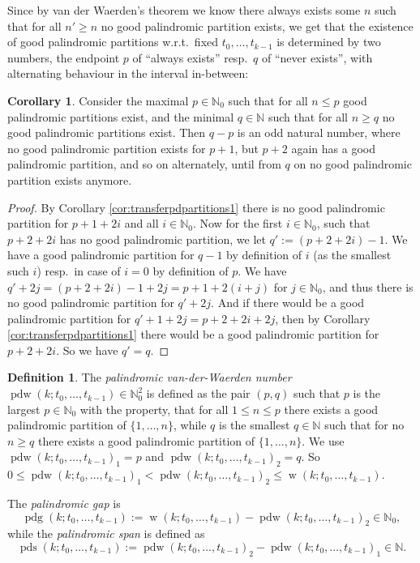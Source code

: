 \documentclass[final,3p,times]{elsarticle}
\theoremstyle{definition}
\newtheorem{defn}{Definition}[section]
\newtheorem{cor}{Corollary}[lem]
\newcommand{\set}[1]{\{#1\}}
\renewcommand{\leq}{\le} %
\newcommand{\NN}{\mathbb{N}}
\newcommand{\NNZ}{\NN_0}
\DeclareMathOperator{\vdw}{w}
\DeclareMathOperator{\vdwpd}{pdw}
\DeclareMathOperator{\pdg}{pdg}
\DeclareMathOperator{\pds}{pds}
\begin{document}
Since by van der Waerden's theorem we know there always exists some $n$ such that for all $n' \geq n$ no good palindromic partition exists, we get that the existence of good palindromic partitions w.r.t.\ fixed $t_0, \dots, t_{k-1}$ is determined by two numbers, the endpoint $p$ of ``always exists'' resp.\ $q$ of ``never exists'', with alternating behaviour in the interval in-between:
\begin{cor}\label{cor:transferpdpartitions2}
  Consider the maximal $p \in \NNZ$ such that for all $n \leq p$ good palindromic partitions exist, and the minimal $q \in \NN$ such that for all $n \geq q$ no good palindromic partitions exist. Then $q - p$ is an odd natural number, where no good palindromic partition exists for $p+1$, but $p+2$ again has a good palindromic partition, and so on alternately, until from $q$ on no good palindromic partition exists anymore.
\end{cor}
\begin{proof}
By Corollary \ref{cor:transferpdpartitions1} there is no good palindromic partition for $p+1 + 2 i$ and all $i \in \NNZ$. Now for the first $i \in \NNZ$, such that $p+2 + 2 i$ has no good palindromic partition, we let $q' := (p+2 + 2 i) - 1 $. We have a good palindromic partition for $q-1$ by definition of $i$ (as the smallest such $i$) resp.\ in case of $i=0$ by definition of $p$. We have $q' + 2 j = (p+2 + 2 i) - 1 + 2 j = p+1 + 2 (i+j)$ for $j \in \NNZ$, and thus there is no good palindromic partition for $q' + 2j$. And if there would be a good palindromic partition for $q' + 1 + 2j = p+2 + 2 i + 2 j$, then by Corollary \ref{cor:transferpdpartitions1} there would be a good palindromic partition for $p+2 + 2i$. So we have $q' = q$.
\end{proof}

\begin{defn}\label{def:pdvdw}
  The \emph{palindromic van-der-Waerden number} $\vdwpd(k; t_0, \dots, t_{k-1}) \in \NNZ^2$ is defined as the pair $(p,q)$ such that $p$ is the largest $p \in \NNZ$ with the property, that for all $1 \leq n \leq p$ there exists a good palindromic partition of $\set{1,\dots,n}$, while $q$ is the smallest $q \in \NN$ such that for no $n \geq q$ there exists a good palindromic partition of $\set{1,\dots,n}$. We use $\vdwpd(k; t_0, \dots, t_{k-1})_1 = p$ and $\vdwpd(k; t_0, \dots, t_{k-1})_2 = q$. So $0 \leq \vdwpd(k; t_0, \dots, t_{k-1})_1 < \vdwpd(k; t_0, \dots, t_{k-1})_2 \leq \vdw(k; t_0, \dots, t_{k-1})$.

  The \emph{palindromic gap} is
  \begin{displaymath}
    \pdg(k; t_0, \dots, t_{k-1}) := \vdw(k; t_0, \dots, t_{k-1}) - \vdwpd(k; t_0, \dots, t_{k-1})_2 \in \NNZ,
  \end{displaymath}
 while the \emph{palindromic span} is defined as
 \begin{displaymath}
  \pds(k; t_0, \dots, t_{k-1}) :=  \vdwpd(k; t_0, \dots, t_{k-1})_2 - \vdwpd(k; t_0, \dots, t_{k-1})_1 \in \NN.
\end{displaymath}
\end{defn}
\end{document}
